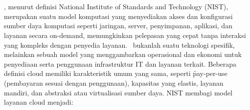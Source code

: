 \chapter{\babDua}

\section{\cc}
\cc, menurut definisi National Institute of Standards and Technology (NIST), merupakan suatu model komputasi yang menyediakan akses dan konfigurasi sumber daya komputasi seperti jaringan, server, penyimpanan, aplikasi, dan layanan secara on-demand, memungkinkan pelepasan yang cepat tanpa interaksi yang kompleks dengan penyedia layanan\cite{mell2009nist}. \cc\ bukanlah suatu teknologi spesifik, melainkan sebuah model yang menggambarkan operasional dan ekonomi untuk penyediaan serta penggunaan infrastruktur IT dan layanan terkait. Beberapa definisi cloud memiliki karakteristik umum yang sama, seperti \f{pay-per-use} (pembayaran sesuai dengan penggunaan), kapasitas yang elastis, layanan mandiri, dan abstraksi atau virtualisasi sumber daya\cite{Buyya_Broberg_Goscinski_2011}. NIST membagi model layanan cloud menjadi\cite{mell2009nist}:
